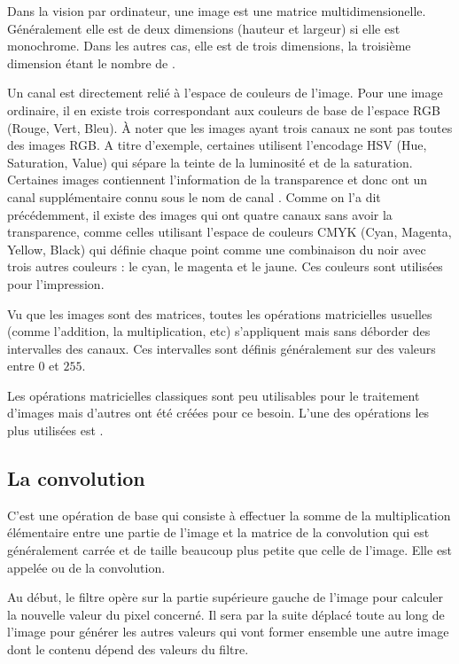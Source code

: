 Dans la vision par ordinateur, une image est une matrice multidimensionelle.
Généralement elle est de deux dimensions (hauteur et largeur) si
elle est monochrome. Dans les autres cas, elle est de trois dimensions, la troisième
dimension étant le nombre de .

Un canal est directement relié à l'espace de couleurs de l'image.
Pour une image ordinaire, il en existe trois correspondant aux couleurs de base
de l'espace RGB (Rouge, Vert, Bleu). \`A noter que les images ayant trois
canaux ne sont pas toutes des images RGB. A titre d'exemple, certaines utilisent
l'encodage HSV (Hue, Saturation, Value) qui sépare la teinte de la luminosité et
de la saturation. Certaines images contiennent l'information de la transparence
et donc ont un canal supplémentaire connu sous le nom de canal .
Comme on l'a dit précédemment, il existe des images qui ont quatre canaux sans
avoir la transparence, comme celles utilisant l'espace de couleurs CMYK
(Cyan, Magenta, Yellow, Black) qui définie chaque point comme une
combinaison du noir avec trois autres couleurs : le cyan, le magenta et le jaune.
Ces couleurs sont utilisées pour l'impression.

Vu que les images sont des matrices, toutes les opérations matricielles usuelles
(comme l'addition, la multiplication, etc) s'appliquent mais sans déborder des
intervalles des canaux. Ces intervalles sont définis généralement sur des
valeurs entre $0$ et $255$.

Les opérations matricielles classiques sont peu utilisables pour le traitement
d'images mais d'autres ont été créées pour ce besoin. L'une des opérations les
plus utilisées est .

\subsection{La convolution}

C'est une opération de base qui consiste à effectuer la somme de la multiplication
élémentaire entre une partie de l'image et la matrice de la convolution qui est
généralement carrée et de taille beaucoup plus petite que celle de l'image.
Elle est appelée  ou  de la convolution.

Au début, le filtre opère sur la partie supérieure gauche de l'image pour
calculer la nouvelle valeur du pixel concerné. Il sera
par la suite déplacé toute au long de l'image pour générer les autres valeurs
qui vont former ensemble une autre image dont le contenu dépend des valeurs du
filtre.

